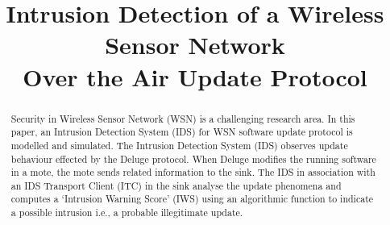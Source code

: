 \documentclass[conference,final]{IEEEtran}
\begin{document}
\title{Intrusion Detection of a Wireless Sensor Network\\Over the Air Update Protocol}
\author{
}


\maketitle


\begin{abstract}
Security in Wireless Sensor Network (WSN) is a challenging research area.
In this paper, an Intrusion Detection System (IDS) for WSN  software update protocol is modelled and simulated. 
The Intrusion Detection System (IDS) observes update behaviour effected by the Deluge protocol.
When Deluge modifies the running software in a mote, the mote sends related  information to the sink. 
The IDS in association with an IDS Transport Client (ITC) in the sink analyse the update phenomena and computes a `Intrusion Warning Score' (IWS) using an algorithmic function to indicate a possible intrusion i.e., a probable illegitimate update.
\end{abstract}


%
\end{document}
